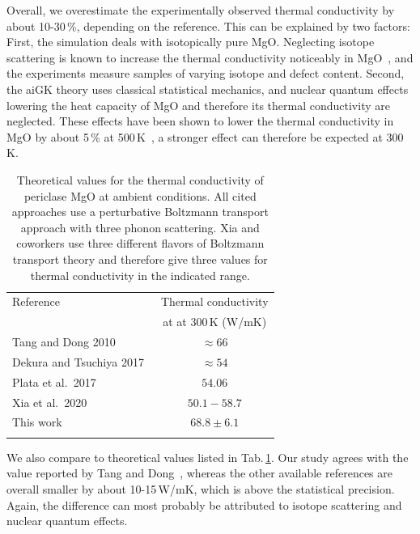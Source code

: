 Overall, we overestimate the experimentally observed thermal conductivity by about 10-30\,\%, depending on the reference. This can be explained by two factors: First, the simulation deals with isotopically pure MgO. Neglecting isotope scattering is known to increase the thermal conductivity noticeably in MgO~\cite{slack1962,tang2010}, and the experiments measure samples of varying isotope and defect content. Second, the aiGK theory uses classical statistical mechanics, and nuclear quantum effects lowering the heat capacity of MgO and therefore its thermal conductivity are neglected. These effects have been shown to lower the thermal conductivity in MgO by about 5\,\% at 500\,K~\cite{Puligheddu2019}, a stronger effect can therefore be expected at 300\,K.
\begin{table}[ht]
  \centering
  \selectfont
  \begin{tabular}{lc}
    \toprule
    Reference & Thermal conductivity \\
    & at at 300\,K (W/mK) \\
    \midrule
    Tang and Dong 2010~\cite{tang2010} & $\approx 66$ \\
    Dekura and Tsuchiya 2017~\cite{dekura2017} & $\approx 54$ \\
    Plata et al.~2017~\cite{AAPL} & $54.06$ \\
    Xia et al.~2020~\cite{xia2020} & $50.1-58.7$ \\
    This work & $68.8 \pm 6.1$ \\
    \bottomrule
    \vspace{.5em}
  \end{tabular}
  \caption{Theoretical values for the thermal conductivity of periclase MgO at ambient conditions. All cited approaches use a perturbative Boltzmann transport approach with three phonon scattering. Xia and coworkers use three different flavors of Boltzmann transport theory and therefore give three values for thermal conductivity in the indicated range.}
  \label{tab:theo.MgO}
\end{table}
We also compare to theoretical values listed in Tab.\,\ref{tab:theo.MgO}.
Our study agrees with the value reported by Tang and Dong~\cite{tang2010}, whereas the other available references are overall smaller by about 10-15\,W/mK, which is above the statistical precision. Again, the difference can most probably be attributed to isotope scattering and nuclear quantum effects.

